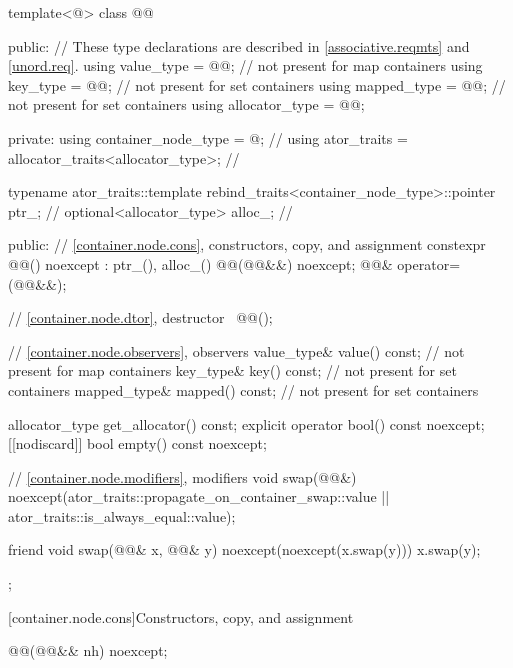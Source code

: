 \begin{codeblock}
template<@\unspecnc@>
class @@ {
public:
  // These type declarations are described in \ref{associative.reqmts} and \ref{unord.req}.
  using value_type     = @\seebelownc{}@;     // not present for map containers
  using key_type       = @\seebelownc{}@;     // not present for set containers
  using mapped_type    = @\seebelownc{}@;     // not present for set containers
  using allocator_type = @\seebelownc{}@;

private:
  using container_node_type = @\unspecnc@;                  // \expos
  using ator_traits = allocator_traits<allocator_type>;     // \expos

  typename ator_traits::template
    rebind_traits<container_node_type>::pointer ptr_;       // \expos
  optional<allocator_type> alloc_;                          // \expos

public:
  // \ref{container.node.cons}, constructors, copy, and assignment
  constexpr @@() noexcept : ptr_(), alloc_() {}
  @@(@@&&) noexcept;
  @@& operator=(@@&&);

  // \ref{container.node.dtor}, destructor
  ~@@();

  // \ref{container.node.observers}, observers
  value_type& value() const;            // not present for map containers
  key_type& key() const;                // not present for set containers
  mapped_type& mapped() const;          // not present for set containers

  allocator_type get_allocator() const;
  explicit operator bool() const noexcept;
  [[nodiscard]] bool empty() const noexcept;

  // \ref{container.node.modifiers}, modifiers
  void swap(@@&)
    noexcept(ator_traits::propagate_on_container_swap::value ||
             ator_traits::is_always_equal::value);

  friend void swap(@@& x, @@& y) noexcept(noexcept(x.swap(y))) {
    x.swap(y);
  }
};
\end{codeblock}

[container.node.cons]{Constructors, copy, and assignment}

\begin{itemdecl}
@@(@@&& nh) noexcept;
\end{itemdecl}

